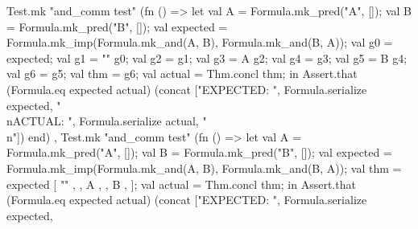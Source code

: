 \nwenddocs{}\endmoddef\nwstartdeflinemarkup{}\nwenddeflinemarkup
  Test.mk "and_comm test" (fn () =>
    let
      val A = Formula.mk_pred("A", []);
      val B = Formula.mk_pred("B", []);
      val expected = Formula.mk_imp(Formula.mk_and(A, B),
                                    Formula.mk_and(B, A));
      val g0 =  expected;
      val g1 =  "" g0;
      val g2 =  g1;
      val g3 =  A g2;
      val g4 =  g3;
      val g5 =  B g4;
      val g6 =  g5;
      val thm =  g6;
      val actual = Thm.concl thm;
    in
      Assert.that (Formula.eq expected actual)
                  (concat ["EXPECTED: ",
                           Formula.serialize expected,
                           "\\nACTUAL: ",
                           Formula.serialize actual,
                           "\\n"])
    end)
, Test.mk "and_comm  test" (fn () =>
    let
      val A = Formula.mk_pred("A", []);
      val B = Formula.mk_pred("B", []);
      val expected = Formula.mk_imp(Formula.mk_and(A, B),
                                    Formula.mk_and(B, A));
      val thm =  expected
                             [  ""
                             , 
                             ,  A
                             , 
                             ,  B
                             , ];
      val actual = Thm.concl thm;
    in
      Assert.that (Formula.eq expected actual)
                  (concat ["EXPECTED: ",
                           Formula.serialize expected,

